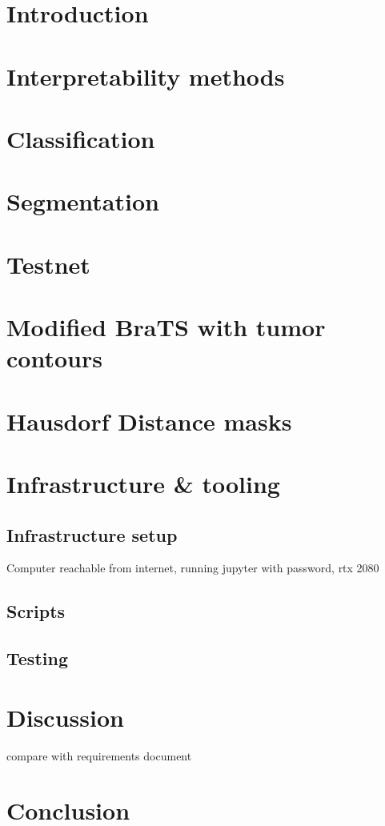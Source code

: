 \chapter{Introduction}


\chapter{Interpretability methods}







\chapter{Classification}


\chapter{Segmentation}


\chapter{Testnet}


\chapter{Modified BraTS with tumor contours}


\chapter{Hausdorf Distance masks}




\chapter{Infrastructure \& tooling}
\section{Infrastructure setup}
Computer reachable from internet, running jupyter with password,
rtx 2080

\section{Scripts}

\section{Testing}


\chapter{Discussion}
compare with requirements document

\chapter{Conclusion}